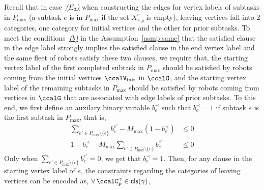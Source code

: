 \documentclass[Afour,sageh,times]{sagej}
\newcommand{\clause}[1]{\mathsf{cls}(#1)}
\begin{document}
{{{%

Recall that in case~\hyperref[edge:vertex3]{\it ($E_3$)}  when constructing the edges for vertex labels of subtasks in $P_{\text{max}}$ (a subtask $e$ is in $P_{\text{max}}$ if the set $X_{\succ_P}^e$ is empty), leaving vertices fall into 2 categories, one category for initial vertices and the other for prior subtasks. To meet the conditions~\hyperref[asmp:b]{\it (b)}  in the Assumption~\ref{asmp:same} that the satisfied clause in the edge label strongly implies the satisfied clause in the end vertex label and the same fleet of robots satisfy these two clauses, we require that, the starting vertex label of the first completed  subtask in $P_{\text{max}}$ should be satisfied by robots coming from the initial vertices $\ccalV_{\text{init}}$ in $\ccalG$, and the starting vertex label of the remaining subtasks in $P_{\text{max}}$ should be satisfied by robots coming from vertices in $\ccalG$ that are associated with edge labels of prior subtasks. To this end, we first define an auxilary binary variable $b_{e}^{\prec}$ such that $b_{e}^{\prec}= 1$ if subtask $e$ is the first subtask in $P_{\text{max}}$, that is,
\begin{subequations}
  \begin{align}
   \sum_{e' \in P_{\text{max}}\setminus \{e\}} {b}_e^{e'}  - M_{\text{max}} (1 - b_{e}^{\prec}) & \leq 0\\
    1 - b_{e}^{\prec} -  M_{\text{max}}  \sum_{e' \in P_{\text{max}}\setminus \{e\}} {b}_e^{e'}    & \leq 0
  \end{align}
\end{subequations}
Only when $ \sum_{e' \in P_{\text{max}}\setminus \{e\}} {b}_e^{e'}=0$, we get that $b_e^{\prec}=1$. Then, for any clause in the starting vertex label of $e$, the constraints regarding the categories of leaving vertices can be encoded as, $\forall \, \ccalC_p^\gamma \in \clause{\gamma} $,
}}}
\end{document}
